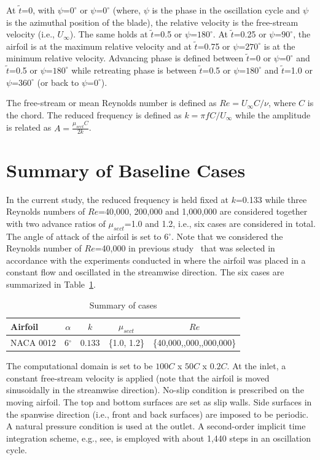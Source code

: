 At $\tilde{t}$=0, with $\psi$=$0^\circ$ or $\psi$=$0^\circ$ (where, $\psi$ is the phase in the oscillation cycle and $\psi$ is the azimuthal position of the blade), the relative velocity is the free-stream velocity (i.e., $U_\infty$).
The same holds at $\tilde{t}$=0.5 or $\psi$=$180^\circ$.
At $\tilde{t}$=0.25 or $\psi$=$90^\circ$, the airfoil is at the maximum relative velocity and at $\tilde{t}$=0.75 or $\psi$=$270^\circ$ is at the minimum relative velocity.
Advancing phase is defined between $\tilde{t}$=0 or $\psi$=$0^\circ$ and $\tilde{t}$=0.5 or $\psi$=$180^\circ$ while retreating phase is between $\tilde{t}$=0.5 or $\psi$=$180^\circ$ and $\tilde{t}$=1.0 or $\psi$=$360^\circ$ (or back to $\psi$=$0^\circ$).

The free-stream or mean Reynolds number is defined as $Re=U_\infty C/\nu$, where $C$ is the chord.
The reduced frequency is defined as $k=\pi f C/U_\infty$ while the amplitude is related as $A = \frac{\mu_{sect} C}{2k}$.

\section{Summary of Baseline Cases}
\label{sec:baseline_case_summary}

In the current study, the reduced frequency is held fixed at $k$=0.133 while three Reynolds numbers of $Re$=40,000, 200,000 and 1,000,000 are considered together with two advance ratios of $\mu_{sect}$=1.0 and 1.2, i.e., six cases are considered in total.
The angle of attack of the airfoil is set to 6$^\circ$.
Note that we considered the Reynolds number of $Re$=40,000 in previous study~\cite{bib:kocher_scitech2017} that was selected in accordance with the experiments conducted in \cite{bib:granlund2016} where the airfoil was placed in a constant flow and oscillated in the streamwise direction.
The six cases are summarized in Table~\ref{table:summary_cases}.

\begin{table}[H]
\centering
\caption{Summary of cases}
\label{table:summary_cases}
\begin{tabular}{|l|c|c|c|c|}
\hline
Airfoil   & $\alpha$ & $k$ & $\mu_{sect}$ & $Re$ \\
\hline
\hline
NACA 0012 & 6$^\circ$ & $0.133$ & \{1.0, 1.2\} & \{40,000,\; 200,000,\; 1,000,000\} \\
\hline
\end{tabular}
\end{table}

The computational domain is set to be $100C$ x $50C$ x $0.2C$.
At the inlet, a constant free-stream velocity is applied
(note that the airfoil is moved sinusoidally in the streamwise direction).
No-slip condition is prescribed on the moving airfoil.
The top and bottom surfaces are set as slip walls.
Side surfaces in the spanwise direction (i.e., front and back surfaces) are imposed to be periodic.
A natural pressure condition is used at the outlet.
A second-order implicit time integration scheme, e.g., see\cite{bib:tran2017b}, is employed with about 1,440 steps in an oscillation cycle.

